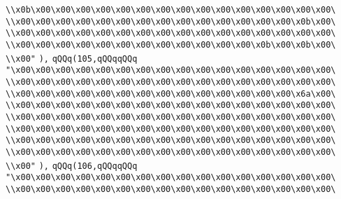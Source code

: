 \verb|\\x0b\x00\x00\x00\x00\x00\x00\x00\x00\x00\x00\x00\x00\x00\x00\x00\|\newline
\verb|\\x00\x00\x00\x00\x00\x00\x00\x00\x00\x00\x00\x00\x00\x00\x0b\x00\|\newline
\verb|\\x00\x00\x00\x00\x00\x00\x00\x00\x00\x00\x00\x00\x00\x00\x00\x00\|\newline
\verb|\\x00\x00\x00\x00\x00\x00\x00\x00\x00\x00\x00\x00\x0b\x00\x0b\x00\|\newline
\verb|\\x00"|\newline
\verb|),|\newline
\verb|qQQq(105,qQQqqQQq|\newline
\verb|"\x00\x00\x00\x00\x00\x00\x00\x00\x00\x00\x00\x00\x00\x00\x00\x00\|\newline
\verb|\\x00\x00\x00\x00\x00\x00\x00\x00\x00\x00\x00\x00\x00\x00\x00\x00\|\newline
\verb|\\x00\x00\x00\x00\x00\x00\x00\x00\x00\x00\x00\x00\x00\x00\x6a\x00\|\newline
\verb|\\x00\x00\x00\x00\x00\x00\x00\x00\x00\x00\x00\x00\x00\x00\x00\x00\|\newline
\verb|\\x00\x00\x00\x00\x00\x00\x00\x00\x00\x00\x00\x00\x00\x00\x00\x00\|\newline
\verb|\\x00\x00\x00\x00\x00\x00\x00\x00\x00\x00\x00\x00\x00\x00\x00\x00\|\newline
\verb|\\x00\x00\x00\x00\x00\x00\x00\x00\x00\x00\x00\x00\x00\x00\x00\x00\|\newline
\verb|\\x00\x00\x00\x00\x00\x00\x00\x00\x00\x00\x00\x00\x00\x00\x00\x00\|\newline
\verb|\\x00"|\newline
\verb|),|\newline
\verb|qQQq(106,qQQqqQQq|\newline
\verb|"\x00\x00\x00\x00\x00\x00\x00\x00\x00\x00\x00\x00\x00\x00\x00\x00\|\newline
\verb|\\x00\x00\x00\x00\x00\x00\x00\x00\x00\x00\x00\x00\x00\x00\x00\x00\|\newline
